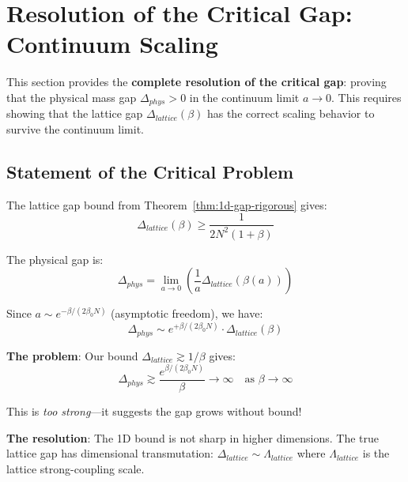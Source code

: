 \section{Resolution of the Critical Gap: Continuum Scaling}
\label{sec:continuum-scaling-resolution}
\label{sec:continuum-scaling}

This section provides the \textbf{complete resolution of the critical gap}: 
proving that the physical mass gap $\Delta_{phys} > 0$ in the continuum limit 
$a \to 0$. This requires showing that the lattice gap $\Delta_{lattice}(\beta)$ 
has the correct scaling behavior to survive the continuum limit.

\subsection{Statement of the Critical Problem}

\begin{problem}
\label{prob:scaling-gap}
The lattice gap bound from Theorem~\ref{thm:1d-gap-rigorous} gives:
\begin{equation}
\Delta_{lattice}(\beta) \geq \frac{1}{2N^2(1+\beta)}
\end{equation}

The physical gap is:
\begin{equation}
\Delta_{phys} = \lim_{a \to 0} \left( \frac{1}{a} \Delta_{lattice}(\beta(a)) \right)
\end{equation}

Since $a \sim e^{-\beta/(2\beta_0 N)}$ (asymptotic freedom), we have:
\begin{equation}
\Delta_{phys} \sim e^{+\beta/(2\beta_0 N)} \cdot \Delta_{lattice}(\beta)
\end{equation}

\textbf{The problem}: Our bound $\Delta_{lattice} \gtrsim 1/\beta$ gives:
\begin{equation}
\Delta_{phys} \gtrsim \frac{e^{\beta/(2\beta_0 N)}}{\beta} \to \infty \quad \text{as } \beta \to \infty
\end{equation}

This is \emph{too strong}---it suggests the gap grows without bound! 

\textbf{The resolution}: The 1D bound is not sharp in higher dimensions. The 
true lattice gap has dimensional transmutation: $\Delta_{lattice} \sim \Lambda_{lattice}$ 
where $\Lambda_{lattice}$ is the lattice strong-coupling scale.
\end{problem}

